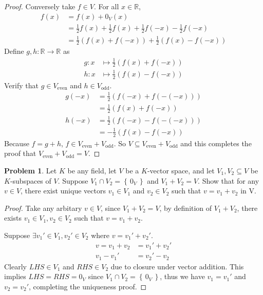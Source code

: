 \documentclass{article}
\theoremstyle{definition}
\newtheorem{problem}{Problem}
\numberwithin{equation}{problem}
\newcommand{\R}{\mathbb{R}}
\newcommand{\set}[1]{\left\{\,#1\,\right\}}
\renewcommand{\vec}[1]{\mathit{#1}_V}
\begin{document}
\begin{enumerate}[label=(\alph*)]
\begin{proof}
            Conversely take $f\in V$. For all $x\in \R$,
            \begin{align*}
                f(x) &= f(x) + \vec{0}(x) \\
                &= \frac{1}{2} f(x) + \frac{1}{2} f(x) + \frac{1}{2} f(-x) - \frac{1}{2} f(-x)\\
                &= \frac{1}{2} (f(x) + f(-x)) + \frac{1}{2} (f(x) - f(-x))
            \end{align*}
            Define $g,h : \R \to \R$ as
            \begin{align*}
                g: x &\mapsto \frac{1}{2} (f(x) + f(-x)) \\
                h: x &\mapsto \frac{1}{2}  (f(x) - f(-x))
            \end{align*}
            Verify that $g\in V_\text{even}$ and $h\in V_\text{odd}$.
            \begin{align*}
                g(-x) &= \frac{1}{2}(f(-x) + f(-(-x)))  \\
                &= \frac{1}{2}(f(x) + f(-x))    \\
                h(-x) &= \frac{1}{2}(f(-x) - f(-(-x)))  \\
                &= -\frac{1}{2}(f(x) - f(-x))
            \end{align*}
            Because $f = g + h$, $f \in V_\text{even} + V_\text{odd}$.
            So $V \subseteq V_\text{even} + V_\text{odd}$ and this completes the proof that $V_\text{even} + V_\text{odd} = V$.
        \end{proof}
\end{enumerate}

\begin{problem}
    Let $K$ be any field, let $V$ be a $K$-vector space,
    and let $V_1, V_2\subseteq V$ be $K$-subspaces of $V$.
    Suppose $V_1 \cap V_2 = \set{\vec{0}}$ and $V_1 + V_2 = V$.
    Show that for any $v \in V$, there exist unique vectors
    $v_1 \in V_1$ and $v_2 \in V_2$ such that $v = v_1 + v_2$ in V.
\end{problem}
\begin{proof}
    Take any arbitary $v\in V$, since $V_1 + V_2 = V$,
    by definition of $V_1 + V_2$, there exists $v_1 \in V_1, v_2 \in V_2$ such that $v = v_1 + v_2$.

    Suppose $\exists v_1' \in V_1, v_2' \in V_2$ where $v = v_1' + v_2'$.
    \begin{align*}
        v = v_1 + v_2 &= v_1' + v_2'    \\
        v_1 - v_1' &= v_2' - v_2
    \end{align*}
    Clearly $LHS \in V_1$ and $RHS \in V_2$ due to closure under vector addition.
    This implies $LHS = RHS = \vec{0}$ since $V_1 \cap V_2 = \set{\vec{0}}$, thus we have
    $v_1 = v_1'$ and $v_2 = v_2'$, completing the uniqueness proof.
\end{proof}
\end{document}
